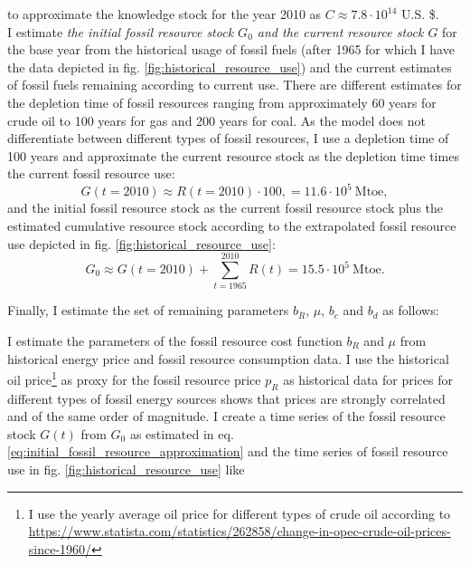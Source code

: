 to approximate the knowledge stock for the year 2010 as $C \approx 7.8 \cdot 10^{14}$ U.S. \$. \\
I estimate \textit{the initial fossil resource stock $G_0$ and the current resource stock $G$} for the base year from the historical usage of fossil fuels (after 1965 for which I have the data depicted in fig. \ref{fig:historical_resource_use}) and the current estimates of fossil fuels remaining according to current use. There are different estimates for the depletion time of fossil resources ranging from approximately 60 years for crude oil to 100 years for gas and 200 years for coal. As the model does not differentiate between different types of fossil resources, I use a depletion time of 100 years and approximate the current resource stock as the depletion time times the current fossil resource use:
\begin{equation} 
  G(t=2010) \approx R(t=2010) \cdot 100, = 11.6 \cdot 10^{5} ~ \mathrm{Mtoe},
  \label{eq:current_fossil_resource_stock}
\end{equation}
and the initial fossil resource stock as the current fossil resource stock plus the estimated cumulative resource stock according to the extrapolated fossil resource use depicted in fig. \ref{fig:historical_resource_use}:
\begin{equation} 
  G_0 \approx G(t=2010) + \sum_{t=1965}^{2010} R(t) = 15.5 \cdot 10^{5} ~ \mathrm{Mtoe}.
  \label{eq:initial_fossil_resource_approximation}
\end{equation}

Finally, I estimate the set of remaining parameters $b_R$, $\mu$, $b_c$ and $b_d$ as follows:

I estimate the parameters of the fossil resource cost function $b_R$ and $\mu$ from historical energy price and fossil resource consumption data. I use the historical oil price\footnote{I use the yearly average oil price for different types of crude oil according to \url{https://www.statista.com/statistics/262858/change-in-opec-crude-oil-prices-since-1960/}} as proxy for the fossil resource price $p_R$ as historical data for prices for different types of fossil energy sources \cite{owidfossilfuels} shows that prices are strongly correlated and of the same order of magnitude. I create a time series of the fossil resource stock $G(t)$ from $G_0$ as estimated in eq. \ref{eq:initial_fossil_resource_approximation} and the time series of fossil resource use in fig. \ref{fig:historical_resource_use} like

